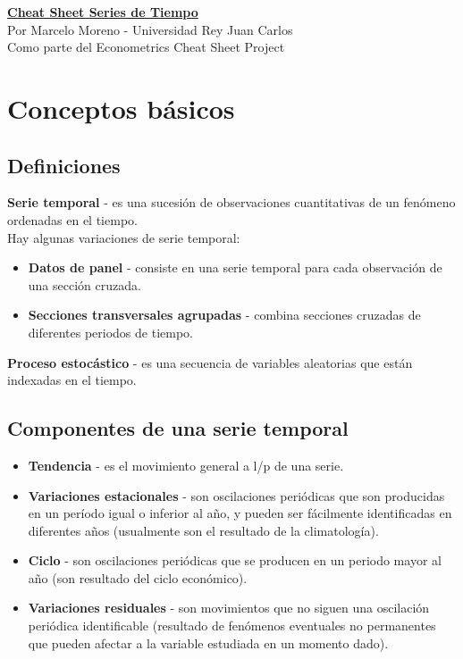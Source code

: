 \documentclass[10pt, a4paper, landscape]{extarticle}
\begin{document}
\setlength{\footskip}{12pt}

\begin{multicols}{3} %
\begin{center}
	\textbf{\LARGE \href{https://github.com/marcelomijas/econometrics-cheatsheet}{Cheat Sheet Series de Tiempo}} \\
	{\footnotesize Por Marcelo Moreno - Universidad Rey Juan Carlos} \\
	{\footnotesize Como parte del Econometrics Cheat Sheet Project}
\end{center}
\section*{Conceptos básicos}
	\subsection*{Definiciones}
		\textbf{Serie temporal} -  es una sucesión de observaciones cuantitativas de un fenómeno ordenadas en el tiempo. \\
		Hay algunas variaciones de serie temporal:
		\begin{itemize}[leftmargin=*]
			\item \textbf{Datos de panel} - consiste en una serie temporal para cada observación de una sección cruzada.
			\item \textbf{Secciones transversales agrupadas} - combina secciones cruzadas de diferentes periodos de tiempo.
		\end{itemize}
		\textbf{Proceso estocástico} - es una secuencia de variables aleatorias que están indexadas en el tiempo.
	\subsection*{Componentes de una serie temporal}
		\begin{itemize}[leftmargin=*]
			\item \textbf{Tendencia} - es el movimiento general a l/p de una serie.
			\item \textbf{Variaciones estacionales} - son oscilaciones periódicas que son producidas en un período igual o inferior al año, y pueden ser fácilmente identificadas en diferentes años (usualmente son el resultado de la climatología).
			\item \textbf{Ciclo} - son oscilaciones periódicas que se producen en un periodo mayor al año (son resultado del ciclo económico).
			\item \textbf{Variaciones residuales} - son movimientos que no siguen una oscilación periódica identificable (resultado de fenómenos eventuales no permanentes que pueden afectar a la variable estudiada en un momento dado).
		\end{itemize}

\end{multicols}
\end{document}
